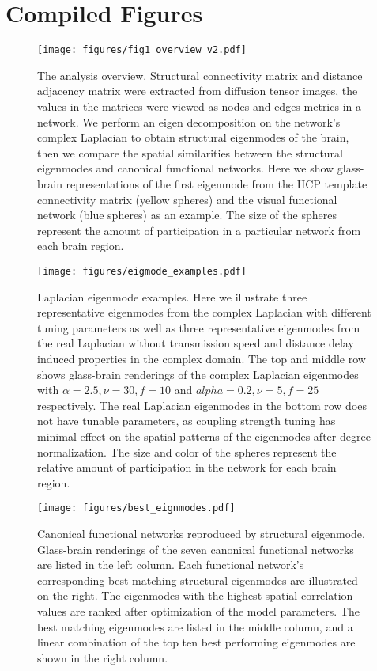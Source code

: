 \documentclass{article}
\begin{document}
\section{Compiled Figures}

\begin{figure}[ht]
  \centering
  \texttt{[image: figures/fig1\_overview\_v2.pdf]}
  \caption{The analysis overview. Structural connectivity matrix and distance adjacency matrix were extracted from diffusion tensor images, the values in the matrices were viewed as nodes and edges metrics in a network. We perform an eigen decomposition on the network's complex Laplacian to obtain structural eigenmodes of the brain, then we compare the spatial similarities between the structural eigenmodes and canonical functional networks. Here we show glass-brain representations of the first eigenmode from the HCP template connectivity matrix (yellow spheres) and the visual functional network (blue spheres) as an example. The size of the spheres represent the amount of participation in a particular network from each brain region.}
  \label{fig:fig1}
\end{figure}

\begin{figure}[ht]
 \centering
 \texttt{[image: figures/eigmode\_examples.pdf]}
 \caption{Laplacian eigenmode examples. Here we illustrate three representative eigenmodes from the complex Laplacian with different tuning parameters as well as three representative eigenmodes from the real Laplacian without transmission speed and distance delay induced properties in the complex domain. The top and middle row shows glass-brain renderings of the complex Laplacian eigenmodes with {$\alpha = 2.5, \nu = 30, f = 10$} and {$alpha = 0.2, \nu = 5, f = 25$} respectively. The real Laplacian eigenmodes in the bottom row does not have tunable parameters, as coupling strength tuning has minimal effect on the spatial patterns of the eigenmodes after degree normalization. The size and color of the spheres represent the relative amount of participation in the network for each brain region.}
 \label{fig:fig2}
\end{figure}

\begin{figure}[ht]
 \centering
 \texttt{[image: figures/best\_eignmodes.pdf]}
 \caption{Canonical functional networks reproduced by structural eigenmode. Glass-brain renderings of the seven canonical functional networks are listed in the left column. Each functional network's corresponding best matching structural eigenmodes are illustrated on the right. The eigenmodes with the highest spatial correlation values are ranked after optimization of the model parameters. The best matching eigenmodes are listed in the middle column, and a linear combination of the top ten best performing eigenmodes are shown in the right column.}
 \label{fig:fig3}
\end{figure}
\end{document}
